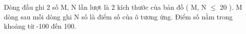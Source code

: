Dòng đầu ghi 2 số M, N lần lượt là 2 kích thước của bản đồ ( M, N  $\le$  20 ). M dòng sau mỗi dòng ghi N số là điểm số của ô tương ứng. Điểm số nằm trong khoảng từ -100 đến 100.  

\